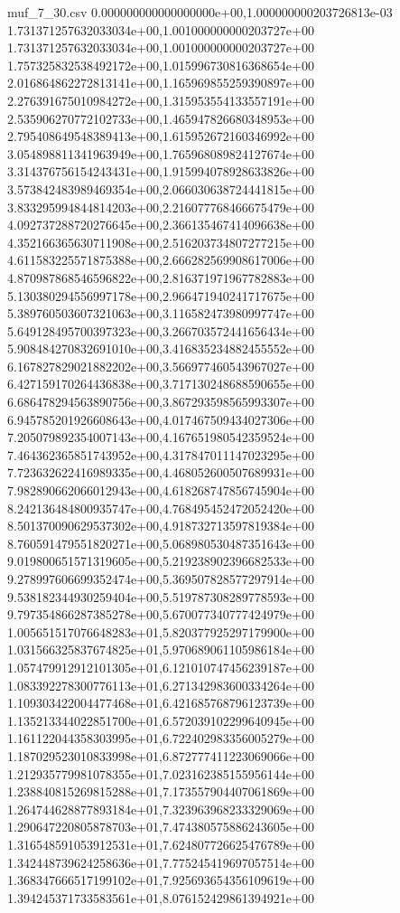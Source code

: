 \begin{filecontents*}{muf_7_30.csv}
0.000000000000000000e+00,1.000000000203726813e-03
1.731371257632033034e+00,1.001000000000203727e+00
1.731371257632033034e+00,1.001000000000203727e+00
1.757325832538492172e+00,1.015996730816368654e+00
2.016864862272813141e+00,1.165969855259390897e+00
2.276391675010984272e+00,1.315953554133557191e+00
2.535906270772102733e+00,1.465947826680348953e+00
2.795408649548389413e+00,1.615952672160346992e+00
3.054898811341963949e+00,1.765968089824127674e+00
3.314376756154243431e+00,1.915994078928633826e+00
3.573842483989469354e+00,2.066030638724441815e+00
3.833295994844814203e+00,2.216077768466675479e+00
4.092737288720276645e+00,2.366135467414096638e+00
4.352166365630711908e+00,2.516203734807277215e+00
4.611583225571875388e+00,2.666282569908617006e+00
4.870987868546596822e+00,2.816371971967782883e+00
5.130380294556997178e+00,2.966471940241717675e+00
5.389760503607321063e+00,3.116582473980997747e+00
5.649128495700397323e+00,3.266703572441656434e+00
5.908484270832691010e+00,3.416835234882455552e+00
6.167827829021882202e+00,3.566977460543967027e+00
6.427159170264436838e+00,3.717130248688590655e+00
6.686478294563890756e+00,3.867293598565993307e+00
6.945785201926608643e+00,4.017467509434027306e+00
7.205079892354007143e+00,4.167651980542359524e+00
7.464362365851743952e+00,4.317847011147023295e+00
7.723632622416989335e+00,4.468052600507689931e+00
7.982890662066012943e+00,4.618268747856745904e+00
8.242136484800935747e+00,4.768495452472052420e+00
8.501370090629537302e+00,4.918732713597819384e+00
8.760591479551820271e+00,5.068980530487351643e+00
9.019800651571319605e+00,5.219238902396682533e+00
9.278997606699352474e+00,5.369507828577297914e+00
9.538182344930259404e+00,5.519787308289778593e+00
9.797354866287385278e+00,5.670077340777424979e+00
1.005651517076648283e+01,5.820377925297179900e+00
1.031566325837674825e+01,5.970689061105986184e+00
1.057479912912101305e+01,6.121010747456239187e+00
1.083392278300776113e+01,6.271342983600334264e+00
1.109303422004477468e+01,6.421685768796123739e+00
1.135213344022851700e+01,6.572039102299640945e+00
1.161122044358303995e+01,6.722402983356005279e+00
1.187029523010833998e+01,6.872777411223069066e+00
1.212935779981078355e+01,7.023162385155956144e+00
1.238840815269815288e+01,7.173557904407061869e+00
1.264744628877893184e+01,7.323963968233329069e+00
1.290647220805878703e+01,7.474380575886243605e+00
1.316548591053912531e+01,7.624807726625476789e+00
1.342448739624258636e+01,7.775245419697057514e+00
1.368347666517199102e+01,7.925693654356109619e+00
1.394245371733583561e+01,8.076152429861394921e+00

\end{filecontents*}
